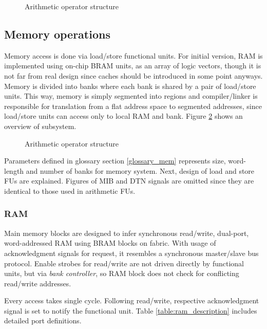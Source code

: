 	\begin{figure}[htbp]
		\centering
		\def\svgwidth{\columnwidth}
		
		\caption{Arithmetic operator structure}
		\label{fig:fu_alu} 
	\end{figure}
	\subsection{Memory operations}
	Memory access is done via load/store functional units. For initial version, RAM is implemented using on-chip BRAM units, as an array of logic vectors, though it is not far from real design since caches should be introduced in some point anyways. Memory is divided into banks where each bank is shared by a pair of load/store units. This way, memory is simply segmented into regions and compiler/linker is responsible for translation from a flat address space to segmented addresses, since load/store units can access only to local RAM and bank. Figure \ref{fig:mem_top} shows an overview of subsystem.
	
	\begin{figure}[htbp]
		\centering
		\def\svgscale{0.5}
		
		\caption{Arithmetic operator structure}
		\label{fig:mem_top} 
	\end{figure}
	
	Parameters defined in glossary section \ref{glossary_mem} represents size, word-length and number of banks for memory system. Next, design of load and store FUs are explained. Figures of MIB and DTN signals are omitted since they are identical to those used in arithmetic FUs.
	\subsubsection{RAM}
	Main memory blocks are designed to infer synchronous read/write, dual-port, word-addressed RAM using BRAM blocks on fabric. With usage of acknowledgment signals for request, it resembles a synchronous master/slave bus protocol. Enable strobes for read/write are not driven directly by functional units, but via \textit{bank controller}, so RAM block does not check for conflicting read/write addresses. 
	
	Every access takes single cycle. Following read/write, respective acknowledgment signal is set to notify the functional unit. Table \ref{table:ram_description} includes detailed port definitions.
	 
